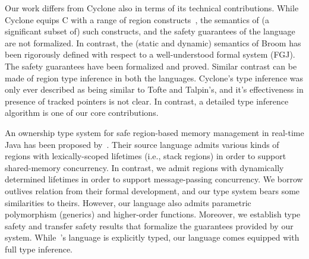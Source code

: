Our work differs from Cyclone also in terms of its technical
contributions. While Cyclone equips C with a range of region
constructs~\cite{cycloneSCP}, the semantics of (a significant subset
of) such constructs, and the safety guarantees of the language are not
formalized. In contrast, the (static and dynamic) semantics of Broom
has been rigorously defined with respect to a well-understood formal
system (FGJ). The safety guarantees have been formalized and proved.
Similar contrast can be made of region type inference in both the languages.
Cyclone’s type inference was only ever described as being similar to
Tofte and Talpin’s, and it’s effectiveness in presence of tracked
pointers is not clear.
In contrast, a detailed type inference algorithm is one of our core contributions.

An ownership type system for safe region-based memory management in
real-time Java has been proposed by~\cite{MIT03}.  
Their source language admits various kinds of regions with
lexically-scoped lifetimes (i.e., stack regions) in order to support
shared-memory concurrency. In contrast, we admit regions with
dynamically determined lifetimes in order to support message-passing
concurrency. We borrow outlives relation from their formal
development, and our type system bears some similarities to theirs.
However, our language also admits parametric polymorphism (generics)
and higher-order functions.
Moreover, we establish type safety and transfer safety results that
formalize the guarantees provided by our system. While~\cite{MIT03}'s
language is explicitly typed, our language comes equipped with full
type inference.

